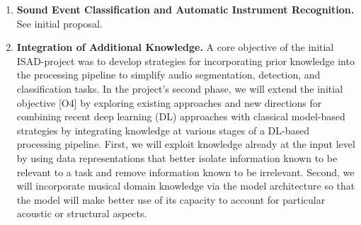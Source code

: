 \documentclass[11pt,a4paper]{article}
\def\PN{\mathrm{ISAD}}
\newcommand{\egc}{e.g.,\ }
\newcommand{\meinard}[1]{{\color{red} #1}}
\newcommand{\jakob}[1]{{\color{magenta} #1}}
\theoremstyle{plain} \newtheorem{define}{Definition}[section]
\begin{document}
{\begin{enumerate}
\item \label{objective:classification}
\textbf{Sound Event Classification and Automatic Instrument Recognition.}
%
See initial proposal.

\item \label{objective:knowledge}
\textbf{Integration of Additional Knowledge.}
%
%
%
A core objective of the initial $\PN$-project was to develop strategies for incorporating prior knowledge into the processing pipeline to simplify audio segmentation, detection, and classification tasks. In the project's second phase, we will extend the initial objective [O4] by exploring existing approaches and new directions for combining recent deep learning (DL) approaches with classical model-based strategies by integrating knowledge at various stages of a DL-based processing pipeline.
%
First, we will exploit knowledge already at the input level by using data representations that better isolate information known to be relevant to a task and remove information known to be irrelevant.
%
Second, we will incorporate musical domain knowledge via the model architecture so that the model will make better use of its capacity to account for particular acoustic or structural aspects.

\end{enumerate}}
\end{document}
